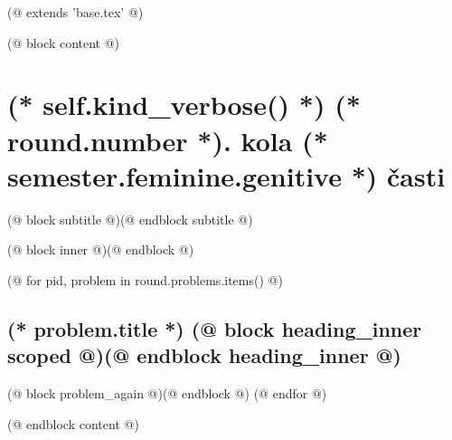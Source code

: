 (@ extends 'base.tex' @)

(@ block content @)
    \thispagestyle{seminar-booklet-first}

    \afterpage{\globaldefs=1\restoregeometry}

    \pagestyle{seminar-booklet-body}


    \section{%
        \texorpdfstring{%
            (* self.kind_verbose() *) (* round.number *). kola (* semester.feminine.genitive *) časti%
        }{%
            (* self.kind_verbose() *)%
        }%
    }
    (@ block subtitle @)(@ endblock subtitle @)

    \setcounter{volume}{(* volume.number *)}
    \setcounter{semester}{(* semester.number *)}
    \setcounter{round}{(* round.number *)}
    \setcounter{section}{(* round.number *)}
    (@ block inner @)(@ endblock @)

    (@ for pid, problem in round.problems.items() @)%
        \setcounter{problem}{(* problem.number *)}%
        \subsection{%
            \texorpdfstring{%
                \large \textbf{(* problem.title *)} \hfill \normalsize%
                (@ block heading_inner scoped @)(@ endblock heading_inner @)}{(* round.number *).(* problem.number *)}%
            \label{(* volume.id *)(* semester.id *)(* round.id *)(* problem.id *)-(* self.kind() *)}%
        }%
        (@ block problem_again @)(@ endblock @)
    (@ endfor @)

(@ endblock content @)
